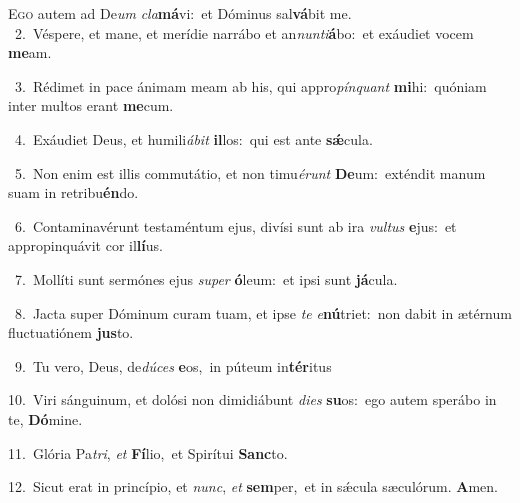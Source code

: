 \lettrine{\initial\textcolor{\initialcolor}{E}}{go} autem ad De\textit{um} \textit{cla}\-\textbf{má}vi:~\star et Dóminus sal\-\textbf{vá}\-bit me.\\
{\numbfont\textcolor{\numbcolor}{~2.}}~Véspere, et mane, et merídie narrábo et an\-\textit{nun}\-\textit{ti}\textbf{á}bo:~\star et exáudiet vocem \textbf{me}\-am.\par
{\numbfont\textcolor{\numbcolor}{~3.}}~Rédimet in pace ánimam meam ab his, qui appro\-\textit{pín}\-\textit{quant} \textbf{mi}\-hi:~\star quóniam inter multos erant \textbf{me}\-cum.\par
{\numbfont\textcolor{\numbcolor}{~4.}}~Exáudiet Deus, et humili\-\textit{á}\-\textit{bit} \textbf{il}\-los:~\star qui est ante \textbf{sǽ}\-cula.\par
{\numbfont\textcolor{\numbcolor}{~5.}}~Non enim est illis commutátio, et non timu\-\textit{é}\-\textit{runt} \textbf{De}\-um:~\star exténdit manum suam in retribu\-\textbf{én}\-do.\par
{\numbfont\textcolor{\numbcolor}{~6.}}~Contaminavérunt testaméntum ejus, divísi sunt ab ira \textit{vul}\-\textit{tus} \textbf{e}\-jus:~\star et appropinquávit cor il\-\textbf{lí}\-us.\par
{\numbfont\textcolor{\numbcolor}{~7.}}~Mollíti sunt sermónes ejus \textit{su}\-\textit{per} \textbf{ó}\-leum:~\star et ipsi sunt \textbf{já}\-cula.\par
{\numbfont\textcolor{\numbcolor}{~8.}}~Jacta super Dóminum curam tuam, et ipse \textit{te} \textit{e}\-\textbf{nú}triet:~\star non dabit in ætérnum fluctuatiónem \textbf{jus}\-to.\par
{\numbfont\textcolor{\numbcolor}{~9.}}~Tu vero, Deus, de\-\textit{dú}\-\textit{ces} \textbf{e}\-os,~\star in púteum in\-\textbf{tér}\-itus\par
{\numbfont\textcolor{\numbcolor}{10.}}~Viri sánguinum, et dolósi non dimidiábunt \textit{di}\-\textit{es} \textbf{su}\-os:~\star ego autem sperábo in te, \textbf{Dó}\-mine.\par
{\numbfont\textcolor{\numbcolor}{11.}}~Glória Pa\-\textit{tri}\-, \textit{et} \textbf{Fí}\-lio,~\star et Spirítui \textbf{Sanc}\-to.\par
{\numbfont\textcolor{\numbcolor}{12.}}~Sicut erat in princípio, et \textit{nunc}\-, \textit{et} \textbf{sem}\-per,~\star et in sǽcula sæculórum. \textbf{A}\-men.\par

